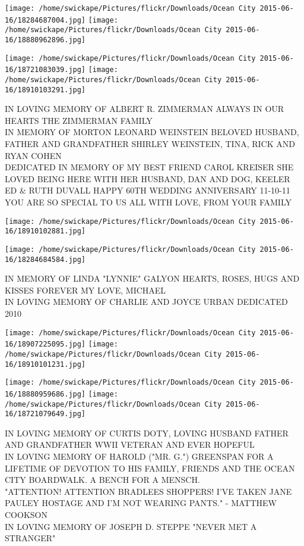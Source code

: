 \documentclass[10pt,letterpaper]{article}
\begin{document}
\texttt{[image: /home/swickape/Pictures/flickr/Downloads/Ocean City 2015-06-16/18284687004.jpg]}
\texttt{[image: /home/swickape/Pictures/flickr/Downloads/Ocean City 2015-06-16/18880962896.jpg]}

\texttt{[image: /home/swickape/Pictures/flickr/Downloads/Ocean City 2015-06-16/18721083039.jpg]}
\texttt{[image: /home/swickape/Pictures/flickr/Downloads/Ocean City 2015-06-16/18910103291.jpg]}

IN LOVING MEMORY OF ALBERT R. ZIMMERMAN ALWAYS IN OUR HEARTS THE ZIMMERMAN FAMILY\\
IN MEMORY OF MORTON LEONARD WEINSTEIN BELOVED HUSBAND, FATHER AND GRANDFATHER SHIRLEY WEINSTEIN, TINA, RICK AND RYAN COHEN\\
DEDICATED IN MEMORY OF MY BEST FRIEND CAROL KREISER SHE LOVED BEING HERE WITH HER HUSBAND, DAN AND DOG, KEELER\\
ED \& RUTH DUVALL HAPPY 60TH WEDDING ANNIVERSARY 11{-}10{-}11 YOU ARE SO SPECIAL TO US ALL WITH LOVE, FROM YOUR FAMILY\\
\pagebreak

\texttt{[image: /home/swickape/Pictures/flickr/Downloads/Ocean City 2015-06-16/18910102881.jpg]}

\vspace{0.25in}
\texttt{[image: /home/swickape/Pictures/flickr/Downloads/Ocean City 2015-06-16/18284684584.jpg]}

IN MEMORY OF LINDA "LYNNIE" GALYON HEARTS, ROSES, HUGS AND KISSES FOREVER MY LOVE, MICHAEL\\
IN LOVING MEMORY OF CHARLIE AND JOYCE URBAN DEDICATED 2010\\
\pagebreak

\texttt{[image: /home/swickape/Pictures/flickr/Downloads/Ocean City 2015-06-16/18907225095.jpg]}
\texttt{[image: /home/swickape/Pictures/flickr/Downloads/Ocean City 2015-06-16/18910101231.jpg]}

\texttt{[image: /home/swickape/Pictures/flickr/Downloads/Ocean City 2015-06-16/18880959686.jpg]}
\texttt{[image: /home/swickape/Pictures/flickr/Downloads/Ocean City 2015-06-16/18721079649.jpg]}

IN LOVING MEMORY OF CURTIS DOTY, LOVING HUSBAND FATHER AND GRANDFATHER WWII VETERAN AND EVER HOPEFUL\\
IN LOVING MEMORY OF HAROLD ("MR. G.") GREENSPAN FOR A LIFETIME OF DEVOTION TO HIS FAMILY, FRIENDS AND THE OCEAN CITY BOARDWALK.  A BENCH FOR A MENSCH.\\
"ATTENTION!  ATTENTION BRADLEES SHOPPERS!  I'VE TAKEN JANE PAULEY HOSTAGE AND I'M NOT WEARING PANTS."  {-} MATTHEW COOKSON\\
IN LOVING MEMORY OF JOSEPH D. STEPPE "NEVER MET A STRANGER"\\
\pagebreak
\end{document}
